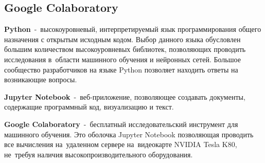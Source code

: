 \subsection{Google Colaboratory}

\textbf{Python}\cite{bib:python}~-~высокоуровневый, интерпретируемый язык программирования общего назначения с открытым исходным кодом.
Выбор данного языка обусловлен большим количеством высокоуровневых библиотек, позволяющих проводить исследования в~области машинного обучения и нейронных сетей.
Большое сообщество разработчиков на языке Python позволяет находить ответы на возникающие вопросы\cite{bib:why_python}.

\textbf{Jupyter Notebook}\cite{bib:jupyter}~-~веб-приложение, позволяющее создавать документы, содержащие программный код, визуализацию и текст.

\textbf{Google Colaboratory}\cite{bib:google_colab}\cite{bib:colab_settings}~-~бесплатный исследовательский инструмент для машинного обучения.
Это оболочка Jupyter Notebook позволяющая проводить все вычисления на~удаленном сервере на~видеокарте NVIDIA Tesla K80\cite{bib:nvidia_k80}, не~требуя наличия высокопроизводительного оборудования.

